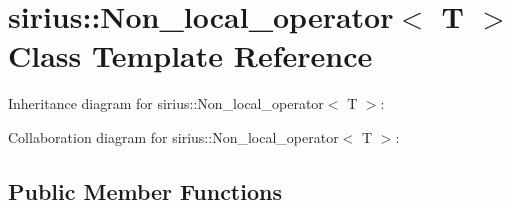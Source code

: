 \hypertarget{classsirius_1_1_non__local__operator}{}\section{sirius\+:\+:Non\+\_\+local\+\_\+operator$<$ T $>$ Class Template Reference}
\label{classsirius_1_1_non__local__operator}


Inheritance diagram for sirius\+:\+:Non\+\_\+local\+\_\+operator$<$ T $>$\+:


Collaboration diagram for sirius\+:\+:Non\+\_\+local\+\_\+operator$<$ T $>$\+:
\subsection*{Public Member Functions}
